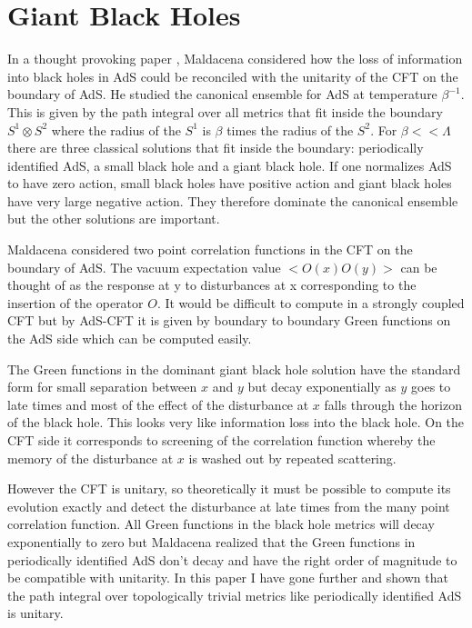 \documentclass[aps,prd,groupedaddress,showpacs,12pt]{revtex4-1}
\begin{document}
\section{Giant Black Holes }

In a thought provoking paper \cite{Maldacena1}, Maldacena considered how the loss of information into black holes in AdS could be reconciled with the unitarity of the CFT on the boundary of AdS. He studied the canonical ensemble for AdS at temperature $\beta^{-1}$. This is given by the path integral over all metrics that fit inside the boundary $S^1\otimes S^2$ where the radius of the $S^1$ is $\beta$ times the radius of the $S^2$. For $\beta <<  \Lambda$ there are three classical solutions that fit inside the boundary: periodically identified AdS, a small black hole and a giant black hole. If one normalizes AdS to have zero action, small black holes have positive action and giant black holes have very large negative action. They therefore dominate the canonical ensemble but the other solutions are important. 

Maldacena considered two point correlation functions in the CFT on the boundary of AdS. The vacuum expectation value $<O(x) O (y)>$ can be thought of as the response at y to disturbances at x corresponding to the insertion of the operator $O$.  It would be difficult to compute in a strongly coupled CFT but by AdS-CFT it is given by boundary to boundary Green functions on the AdS side which can be computed easily. 

The Green functions in the dominant giant black hole solution have the standard form for small separation between $x$ and $y$ but decay exponentially as $y$ goes to late times and most of the effect of the disturbance at $x$ falls through the horizon of the black hole. This looks very like information loss into the black hole. On the CFT side it corresponds to screening of the correlation function whereby the memory of the disturbance at $x$ is washed out by repeated scattering. 

However the CFT is unitary, so theoretically it must be possible to compute its evolution exactly and detect the disturbance at late times from the many point correlation function. All Green functions in the black hole metrics will decay exponentially to zero but Maldacena realized that the Green functions in periodically identified AdS don't decay and have the right order of magnitude to be compatible with unitarity. In this paper I have gone further and shown that the path integral over topologically trivial metrics like periodically identified AdS is unitary.  
\end{document}
